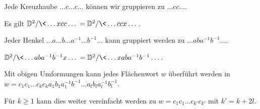 \begin{lem}
	Jede Kreuzhaube $\dotsc c \dotsc c \dotsc$ können wir gruppieren zu $\dotsc cc \dotsc$.
\end{lem}

\begin{lem}
	Es gilt $\D^2 / \<\dotsc xcc \dotsc \> = \D^2 / \< \dotsc ccx \dotsc \>$.
\end{lem}

\begin{lem}
	Jeder Henkel $\dotsc a  \dotsc b \dotsc a^{-1} \dotsc b^{-1} \dotsc$ kann gruppiert werden zu $\dotsc aba^{-1}b^{-1} \dotsc$.
\end{lem}

\begin{lem}
	$\D^2 / \<\dotsc aba^{-1}b^{-1}x\dotsc \> =  \D^2 / \< \dotsc x aba^{-1}b^{-1} \dotsc \>$.
\end{lem}

\begin{st}
	Mit obigen Umformungen kann jedes Flächenwort $w$ überführt werden in $w = c_1c_1 \dotsc c_k c_k a_1b_1a_1^{-1}b^{-1} \dotsc a_l b_l a_l^{-1} b_l^{-1}$.

	Für $k \ge 1$ kann dies weiter vereinfacht werden zu $w = c_1c_1 \dotsc c_{k'} c_{k'}$ mit $k' = k + 2l$.
\end{st}
